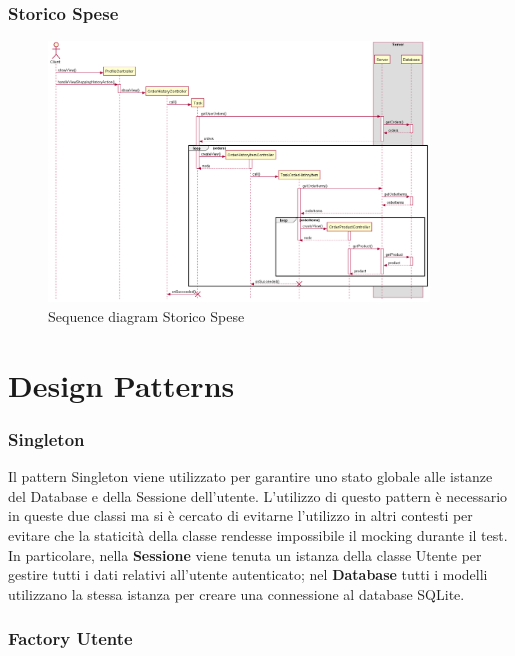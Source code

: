 \documentclass[12pt, a4paper]{report}
\begin{document}
\newpage

\subsubsection{Storico Spese}

\begin{figure}[ht]
  \centering
  \includegraphics[width=0.9\textwidth]{shopping_history_sequence.png}
  \caption{Sequence diagram Storico Spese}
\end{figure}

\newpage

\section{Design Patterns}

\subsubsection{Singleton}	

Il pattern Singleton viene utilizzato per garantire uno stato globale alle
istanze del Database e della Sessione dell'utente. L'utilizzo di questo pattern
è necessario in queste due classi ma si è cercato di evitarne l'utilizzo in
altri contesti per evitare che la staticità della classe rendesse impossibile
il mocking durante il test. In particolare, nella \textbf{Sessione} viene
tenuta un istanza della classe Utente per gestire tutti i dati relativi
all'utente autenticato; nel \textbf{Database} tutti i modelli utilizzano la
stessa istanza per creare una connessione al database SQLite. 

\subsubsection{Factory Utente}
\end{document}
